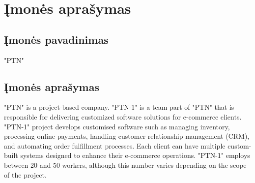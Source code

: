 \section{Įmonės aprašymas}

\subsection{Įmonės pavadinimas}
"PTN"



\subsection{Įmonės aprašymas}
"PTN" is a project-based company. "PTN-1" is a team part of "PTN" that is responsible for delivering customized software solutions for e-commerce clients. "PTN-1" project develops customised software such as managing inventory, processing online payments, handling customer relationship management (CRM), and automating order fulfillment processes. Each client can have multiple custom-built systems designed to enhance their e-commerce operations. "PTN-1" employs between 20 and 50 workers, although this number varies depending on the scope of the project.


